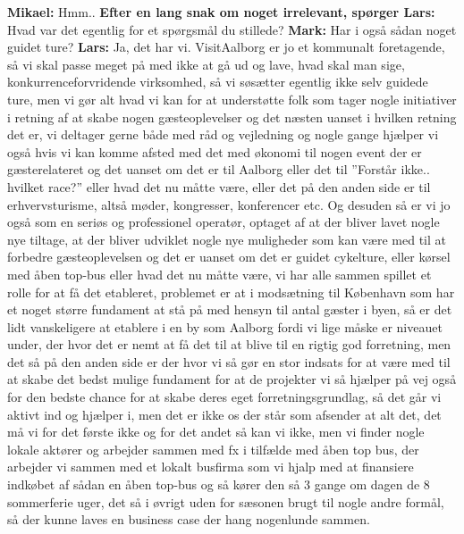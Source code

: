 \textbf{Mikael:} Hmm.. \newline
\textbf{Efter en lang snak om noget irrelevant, spørger Lars:} Hvad var det egentlig for et spørgsmål du stillede? \newline
\textbf{Mark:} Har i også sådan noget guidet ture? \newline
\textbf{Lars:} Ja, det har vi. VisitAalborg er jo et kommunalt foretagende, så vi skal passe meget på med ikke at gå ud og lave, hvad skal man sige, konkurrenceforvridende virksomhed, så vi søsætter egentlig ikke selv guidede ture, men vi gør alt hvad vi kan for at understøtte folk som tager nogle initiativer i retning af at skabe nogen gæsteoplevelser og det næsten uanset i hvilken retning det er, vi deltager gerne både med råd og vejledning og nogle gange hjælper vi også hvis vi kan komme afsted med det med økonomi til nogen event der er gæsterelateret og det uanset om det er til Aalborg eller det til ”Forstår ikke.. hvilket race?” eller hvad det nu måtte være, eller det på den anden side er til erhvervsturisme, altså møder, kongresser, konferencer etc. Og desuden så er vi jo  også som en seriøs og professionel operatør, optaget af at der bliver lavet nogle nye tiltage, at der bliver udviklet nogle nye muligheder som kan være med til at forbedre gæsteoplevelsen og det er uanset om det er guidet cykelture, eller kørsel med åben top-bus eller hvad det nu måtte være, vi har alle sammen spillet et rolle for at få det etableret, problemet er at i modsætning til København som har et noget større fundament at stå på med hensyn til antal gæster i byen, så er det lidt vanskeligere at etablere i en by som Aalborg fordi vi lige måske er niveauet under, der hvor det er nemt at få det til at blive til en rigtig god forretning, men det så på den anden side er der hvor vi så gør en stor indsats for at være med til at skabe det bedst mulige fundament for at de projekter vi så hjælper på vej også for den bedste chance for at skabe deres eget forretningsgrundlag, så det går vi aktivt ind og hjælper i, men det er ikke os der står som afsender at alt det, det må vi for det første ikke og for det andet så kan vi ikke, men vi finder nogle lokale aktører og arbejder sammen med fx i tilfælde med åben top bus, der arbejder vi sammen med et lokalt busfirma som vi hjalp med at finansiere indkøbet af sådan en åben top-bus og så kører den så 3 gange om dagen de 8 sommerferie uger, det så i øvrigt uden for sæsonen brugt til nogle andre formål, så der kunne laves en business case der hang nogenlunde sammen. \newline
